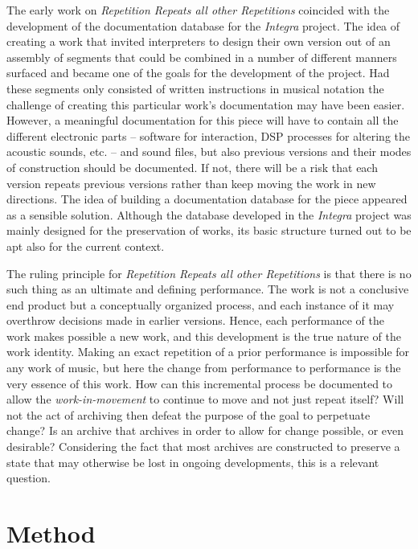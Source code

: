 \documentclass[,a4paper]{llncs}
\begin{document}
The early work on \emph{Repetition Repeats all other Repetitions} coincided with the development of the documentation database for the \emph{Integra} project. The idea of creating a work that invited interpreters to design their own version out of an assembly of segments that could be combined in a number of different manners surfaced and became one of the goals for the development of the project. Had these segments only consisted of written instructions in musical notation the challenge of creating this particular work's documentation may have been easier. However, a meaningful documentation for this piece will have to contain all the different electronic parts -- software for interaction, DSP processes for altering the acoustic sounds, etc. -- and sound files, but also previous versions and their modes of construction should be documented. If not, there will be a risk that each version repeats previous versions rather than keep moving the work in new directions. The idea of building a documentation database for the piece appeared as a sensible solution. Although the database developed in the \emph{Integra} project was mainly designed for the preservation of works, its basic structure turned out to be apt also for the current context.

The ruling principle for \emph{Repetition Repeats all other Repetitions} is that there is no such thing as an ultimate and defining performance. The work is not a conclusive end product but a conceptually organized process, and each instance of it may overthrow decisions made in earlier versions. Hence, each performance of the work makes possible a new work, and this development is the true nature of the work identity. Making an exact repetition of a prior performance is impossible for any work of music, but here the change from performance to performance is the very essence of this work. How can this incremental process be documented to allow the \emph{work-in-movement} to continue to move and not just repeat itself? Will not the act of archiving then defeat the purpose of the goal to perpetuate change? Is an archive that archives in order to allow for change possible, or even desirable? Considering the fact that most archives are constructed to preserve a state that may otherwise be lost in ongoing developments, this is a relevant question. 


\section{Method}
\label{sec:method}
\end{document}
